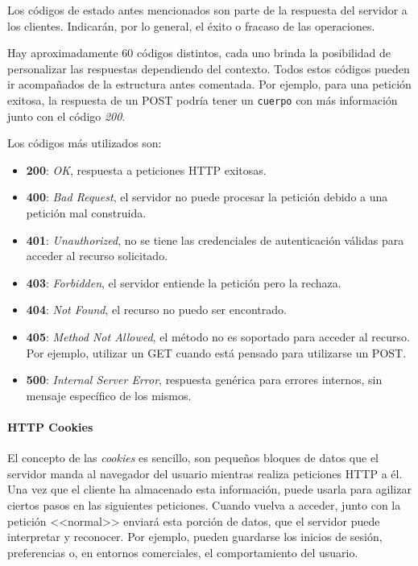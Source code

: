 Los códigos de estado antes mencionados son parte de la respuesta del servidor a
los clientes. Indicarán, por lo general, el éxito o fracaso de las operaciones.

Hay aproximadamente 60 códigos distintos, cada uno brinda la posibilidad de
personalizar las respuestas dependiendo del contexto. Todos estos códigos pueden
ir acompañados de la estructura antes comentada. Por ejemplo, para una petición
exitosa, la respuesta de un POST podría tener un \texttt{cuerpo} con más
información junto con el código \textit{200}. 

Los códigos más utilizados son:

\begin{itemize}
	\item \textbf{200}: \emph{OK}, respuesta a peticiones HTTP exitosas.
  \item \textbf{400}: \emph{Bad Request}, el servidor no puede procesar la petición
  debido a una petición mal construida.
  \item \textbf{401}: \emph{Unauthorized}, no se tiene las credenciales de
  autenticación válidas para acceder al recurso solicitado.
  \item \textbf{403}: \emph{Forbidden}, el servidor entiende la petición pero la
  rechaza.
  \item \textbf{404}: \emph{Not Found}, el recurso no puedo ser encontrado.
  \item \textbf{405}: \emph{Method Not Allowed}, el método no es soportado para acceder
  al recurso. Por ejemplo, utilizar un GET cuando está pensado para utilizarse
  un POST.
  \item \textbf{500}: \emph{Internal Server Error}, respuesta genérica para errores
  internos, sin mensaje específico de los mismos.
\end{itemize}

\paragraph{HTTP Cookies}

El concepto de las \textit{cookies} es sencillo, son pequeños bloques de datos
que el servidor manda al navegador del usuario mientras realiza peticiones HTTP
a él. Una vez que el cliente ha almacenado esta información, puede usarla para
agilizar ciertos pasos en las siguientes peticiones. Cuando vuelva a acceder,
junto con la petición <<normal>> enviará esta porción de datos, que el servidor
puede interpretar y reconocer. Por ejemplo, pueden guardarse los inicios de
sesión, preferencias o, en entornos comerciales, el comportamiento del usuario.

